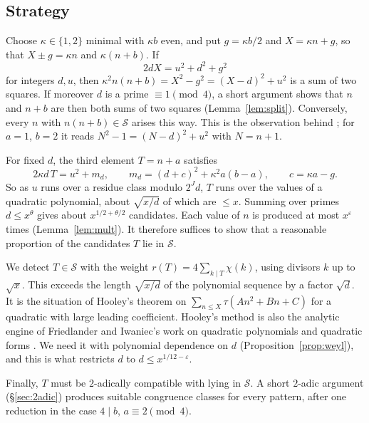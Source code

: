 \documentclass[11pt]{amsart}
\theoremstyle{remark}
\theoremstyle{definition}
\numberwithin{equation}{section}
\newcommand{\Sc}{\mathcal{S}}
\newcommand{\eps}{\varepsilon}
\begin{document}
\subsection{Strategy}\label{sec:strategy}
Choose $\kappa\in\{1,2\}$ minimal with $\kappa b$ even, and put $g=\kappa b/2$ and $X=\kappa n+g$, so that $X\pm g=\kappa n$ and $\kappa(n+b)$. If
\begin{equation}\label{eq:basic}
2dX=u^2+d^2+g^2
\end{equation}
for integers $d,u$, then $\kappa^2n(n+b)=X^2-g^2=(X-d)^2+u^2$ is a sum of two squares. If moreover $d$ is a prime $\equiv1\pmod 4$, a short argument shows that $n$ and $n+b$ are then both sums of two squares (Lemma~\ref{lem:split}). Conversely, every $n$ with $n(n+b)\in\Sc$ arises this way. This is the observation behind \cite{Sk}; for $a=1$, $b=2$ it reads $N^2-1=(N-d)^2+u^2$ with $N=n+1$.

For fixed $d$, the third element $T=n+a$ satisfies
\[
2\kappa d\,T=u^2+m_d,\qquad m_d=(d+c)^2+\kappa^2a(b-a),\qquad c=\kappa a-g.
\]
So as $u$ runs over a residue class modulo $2^Jd$, $T$ runs over the values of a quadratic polynomial, about $\sqrt{x/d}$ of which are $\le x$. Summing over primes $d\le x^{\theta}$ gives about $x^{1/2+\theta/2}$ candidates. Each value of $n$ is produced at most $x^{\eps}$ times (Lemma~\ref{lem:mult}). It therefore suffices to show that a reasonable proportion of the candidates $T$ lie in $\Sc$.

We detect $T\in\Sc$ with the weight $r(T)=4\sum_{k\mid T}\chi(k)$, using divisors $k$ up to $\sqrt x$. This exceeds the length $\sqrt{x/d}$ of the polynomial sequence by a factor $\sqrt d$. It is the situation of Hooley's theorem \cite{Ho63} on $\sum_{n\le X}\tau(An^2+Bn+C)$ for a quadratic with large leading coefficient. Hooley's method is also the analytic engine of Friedlander and Iwaniec's work on quadratic polynomials and quadratic forms \cite{FI78}. We need it with polynomial dependence on $d$ (Proposition~\ref{prop:weyl}), and this is what restricts $d$ to $d\le x^{1/12-\eps}$.

Finally, $T$ must be $2$-adically compatible with lying in $\Sc$. A short $2$-adic argument (\S\ref{sec:2adic}) produces suitable congruence classes for every pattern, after one reduction in the case $4\mid b$, $a\equiv2\pmod 4$.
\end{document}
